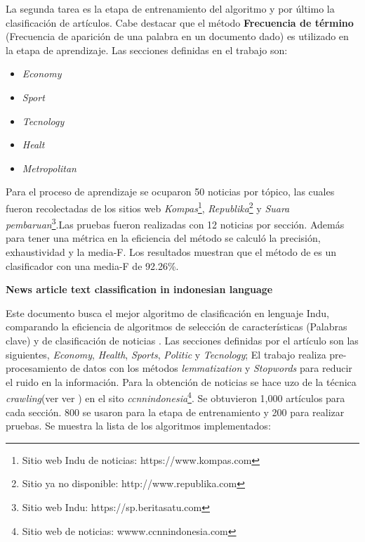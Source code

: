 La segunda tarea es la etapa de entrenamiento del algoritmo y por último la clasificación de artículos. Cabe destacar que el método \textbf{Frecuencia de término} (Frecuencia de aparición de una palabra en un documento dado) es utilizado en la etapa de aprendizaje. Las secciones definidas en el trabajo son: 

\begin{itemize}

	\item \textit{Economy}
	\item \textit{Sport}
	\item \textit{Tecnology}
	\item \textit{Healt} 
	\item \textit{Metropolitan}

\end{itemize}

Para el proceso de aprendizaje se ocuparon 50 noticias por tópico, las cuales fueron recolectadas de los sitios web \textit{Kompas}\footnote{Sitio web Indu de noticias: https://www.kompas.com}, \textit{Republika}\footnote{Sitio ya no disponible: http://www.republika.com} y \textit{Suara pembaruan}\footnote{Sitio web Indu: https://sp.beritasatu.com}.Las pruebas fueron realizadas con 12 noticias por sección. Además para tener una métrica en la eficiencia del método se calculó la precisión, exhaustividad y la media-F. Los resultados muestran que el método de  es un clasificador con una media-F de 92.26\%.\\ 


\begin{large}
	 \textbf{News article text classification in indonesian language}
	 \\
\end{large}

Este documento busca el mejor algoritmo de clasificación en lenguaje Indu, comparando la eficiencia de algoritmos de selección de características (Palabras clave) y de clasificación de noticias \citep{CD8}. Las secciones definidas por el artículo son las siguientes, \textit{Economy}, \textit{Health}, \textit{Sports}, \textit{Politic} y \textit{Tecnology}; El trabajo realiza pre-procesamiento de datos con  los métodos \textit{lemmatization} y \textit{Stopwords} para reducir el ruido en la información. Para la obtención de noticias se hace uzo de la técnica \textit{crawling}(ver ver ) en el sito \textit{ccnnindonesia}\footnote{Sitio web de noticias: wwww.ccnnindonesia.com}. Se obtuvieron 1,000 artículos para cada sección. 800 se usaron para la etapa de entrenamiento y 200 para realizar pruebas. Se muestra la lista de los algoritmos implementados:

